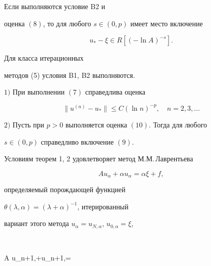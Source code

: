  


\begin{thm} 


Если выполняются условие $\mathrm B2$ и 


оценка $(8)$, то для любого $s\in(0,p)$ имеет место включение 


\begin{equation} 


u_*-\xi\in R[(-\ln A)^{-s}]. 


\end{equation} 


\end{thm} 


 


Для класса итерационных 


методов (5) условия B1, B2 выполняются. 


 


\begin{thm} 


$1)$ При выполнении $(7)$ справедлива оценка 


\begin{equation} 


\|u^{(n)}-u_*\|\le C(\ln n)^{-p},\quad n=2,3,\dotsc 


\end{equation} 


 


$2)$ Пусть при $p>0$ выполняется оценка $(10)$. Тогда для любого 


$s\in(0,p)$ справедливо включение $(9)$. 


\end{thm} 


 


Условиям теорем 1, 2 удовлетворяет метод М.М.\,Лаврентьева 


$$ 


A u_\alpha+\alpha u_\alpha=\alpha\xi+f, 


$$ 


определяемый порождающей функцией 


$\theta(\lambda,\alpha)=(\lambda+\alpha)^{-1}$, итерированный 


вариант этого метода $u_\alpha=u_{N,\alpha}$, $u_{0,\alpha}=\xi$, 


$$ 


A u_{n+1,\alpha}+\alpha u_{n+1,\alpha}= 


